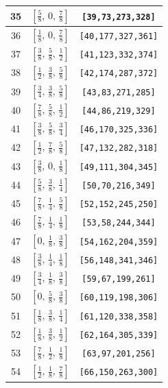 \documentclass[fleqn,8pt]{jsarticle}
\begin{document}
\begin{longtable}{ccc}
35 & $\left[ \frac{5}{8},\, 0,\, \frac{7}{8} \right]$ & {\tt [39,73,273,328]} \\ \hline
36 & $\left[ \frac{1}{8},\, 0,\, \frac{7}{8} \right]$ & {\tt [40,177,327,361]} \\ \hline
37 & $\left[ \frac{3}{8},\, \frac{5}{8},\, \frac{1}{2} \right]$ & {\tt [41,123,332,374]} \\ \hline
38 & $\left[ \frac{1}{2},\, \frac{3}{8},\, \frac{5}{8} \right]$ & {\tt [42,174,287,372]} \\ \hline
39 & $\left[ \frac{3}{4},\, \frac{3}{8},\, \frac{5}{8} \right]$ & {\tt [43,83,271,285]} \\ \hline
40 & $\left[ \frac{7}{8},\, \frac{5}{8},\, \frac{1}{2} \right]$ & {\tt [44,86,219,329]} \\ \hline
41 & $\left[ \frac{3}{8},\, \frac{5}{8},\, \frac{3}{4} \right]$ & {\tt [46,170,325,336]} \\ \hline
42 & $\left[ \frac{1}{2},\, \frac{7}{8},\, \frac{5}{8} \right]$ & {\tt [47,132,282,318]} \\ \hline
43 & $\left[ \frac{3}{8},\, 0,\, \frac{1}{8} \right]$ & {\tt [49,111,304,345]} \\ \hline
44 & $\left[ \frac{5}{8},\, \frac{3}{8},\, \frac{1}{4} \right]$ & {\tt [50,70,216,349]} \\ \hline
45 & $\left[ \frac{7}{8},\, \frac{1}{4},\, \frac{5}{8} \right]$ & {\tt [52,152,245,250]} \\ \hline
46 & $\left[ \frac{7}{8},\, \frac{1}{4},\, \frac{1}{8} \right]$ & {\tt [53,58,244,344]} \\ \hline
47 & $\left[ 0,\, \frac{1}{8},\, \frac{3}{8} \right]$ & {\tt [54,162,204,359]} \\ \hline
48 & $\left[ \frac{3}{8},\, \frac{1}{4},\, \frac{1}{8} \right]$ & {\tt [56,148,341,346]} \\ \hline
49 & $\left[ \frac{3}{4},\, \frac{1}{8},\, \frac{3}{8} \right]$ & {\tt [59,67,199,261]} \\ \hline
50 & $\left[ 0,\, \frac{5}{8},\, \frac{3}{8} \right]$ & {\tt [60,119,198,306]} \\ \hline
51 & $\left[ \frac{1}{8},\, \frac{3}{8},\, \frac{1}{4} \right]$ & {\tt [61,120,338,358]} \\ \hline
52 & $\left[ \frac{1}{8},\, \frac{3}{8},\, \frac{1}{2} \right]$ & {\tt [62,164,305,339]} \\ \hline
53 & $\left[ \frac{7}{8},\, \frac{1}{2},\, \frac{1}{8} \right]$ & {\tt [63,97,201,256]} \\ \hline
54 & $\left[ \frac{1}{2},\, \frac{1}{8},\, \frac{7}{8} \right]$ & {\tt [66,150,263,300]} \\ \hline

\end{longtable}
\end{document}
